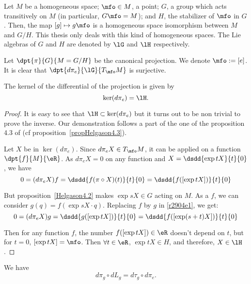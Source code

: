  Let $M$ be a homogeneous space; $\mfo\in M$, a point; $G$, a group which acts transitively on $M$ (in particular, $G\mfo=M$); and $H$, the stabilizer of $\mfo$ in $G$. Then, the map $[g]\mapsto g\mfo$ is a homogeneous space isomorphism between $M$ and $G/H$. This thesis only deals with this kind of homogeneous spaces. The Lie algebras of $G$ and $H$ are denoted by $\lG$ and $\lH$ respectively.


Let $\dpt{\pi}{G}{M=G/H}$ be the canonical projection. We denote $\mfo:=[e]$. It is clear that $\dpt{d\pi_e}{\lG}{T_{\mfo}M}$ is surjective.
\begin{proposition}
	The kernel of the differential of the projection is given by
	\begin{equation}
 		\ker(d\pi_e)=\lH.
	\end{equation}
\end{proposition}

\begin{proof}
It is easy to see that $\lH\subset \ker(d\pi_e)$ but it turns out to be non trivial to prove the inverse. Our demonstration follows a part of the one of the proposition 4.3 of \cite{Helgason} (cf proposition~\ref{propHelgason4.3}).

Let $X$ be in $\ker(d\pi_e)$. Since $d\pi_eX\in T_{\mfo}M$, it can be applied on a function $\dpt{f}{M}{\eR}$. As $d\pi_eX=0$ on any function and $X=\dsdd{\exp tX}{t}{0}$, we have
\begin{equation}
   0=(d\pi_eX)f=\dsdd{f(\pi\circ X)(t)}{t}{0}
               =\dsdd{f([\exp tX])}{t}{0}                      \label{r2904e1}
\end{equation}

But proposition~\ref{Helgason4.2} makes $\exp sX\in G$ acting on $M$. As a $f$, we can consider $g(q)=f(\exp sX\cdot q)$. Replacing $f$  by $g$ in \eqref{r2904e1}, we get:
\begin{equation}
   0=(d\pi_eX)g=\dsdd{g([\exp tX])}{t}{0}
               =\dsdd{f([\exp(s+t)X])}{t}{0}
\end{equation}

Then for any function $f$, the number $f([\exp tX])\in\eR$ doesn't depend on $t$, but for $t=0$, $[\exp tX]=\mfo$. Then $\forall t\in\eR$, $\exp tX\in H$, and therefore, $X\in \lH$.
\end{proof}

\begin{lemma}
	We have
	\begin{equation}  \label{Eqdpigdtaudpi}
		d\pi_g\circ dL_g=d\tau_g\circ d\pi_e.
	\end{equation}
\end{lemma}

